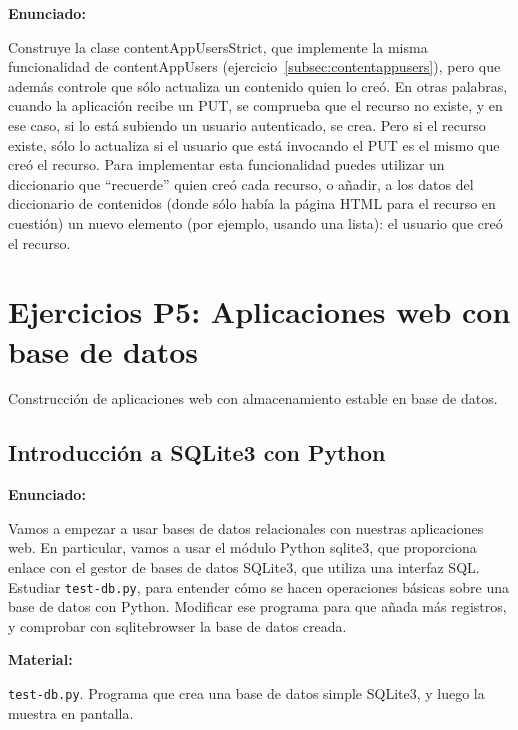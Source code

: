 \textbf{Enunciado:}

Construye la clase contentAppUsersStrict, que implemente la misma funcionalidad de contentAppUsers (ejercicio~\ref{subsec:contentappusers}), pero que además controle que sólo actualiza un contenido quien lo creó. En otras palabras, cuando la aplicación recibe un PUT, se comprueba que el recurso no existe, y en ese caso, si lo está subiendo un usuario autenticado, se crea. Pero si el recurso existe, sólo lo actualiza si el usuario que está invocando el PUT es el mismo que creó el recurso. Para implementar esta funcionalidad puedes utilizar un diccionario que ``recuerde'' quien creó cada recurso, o añadir, a los datos del diccionario de contenidos (donde sólo había la página HTML para el recurso en cuestión) un nuevo elemento (por ejemplo, usando una lista): el usuario que creó el recurso.


\section{Ejercicios P5: Aplicaciones web con base de datos}

Construcción de aplicaciones web con almacenamiento estable en base de datos.

\subsection{Introducción a SQLite3 con Python}
\label{subsec:sqlite3-python}

\textbf{Enunciado:}

Vamos a empezar a usar bases de datos relacionales con nuestras aplicaciones web. En particular, vamos a usar el módulo Python sqlite3, que proporciona enlace con el gestor de bases de datos SQLite3, que utiliza una interfaz SQL. Estudiar \texttt{test-db.py}, para entender cómo se hacen operaciones básicas sobre una base de datos con Python. Modificar ese programa para que añada más registros, y comprobar con sqlitebrowser la base de datos creada.

\textbf{Material:}

\texttt{test-db.py}. Programa que crea una base de datos simple SQLite3, y luego la muestra en pantalla.


